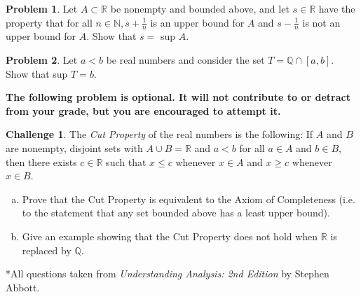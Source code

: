 \documentclass{amsart}
\newcommand{\+}[1]{\ensuremath{\mathbf{#1}}}
\newcommand{\R}{{\mathbb R}}
\theoremstyle{definition}
\newtheorem{prob}{Problem}
\newtheorem{chal}{Challenge}
\begin{document}
\begin{prob}
 Let $A \subset \R$ be nonempty and bounded above, and
 let $s \in \R$ have the property that for all 
 $n \in \mathbb{N}, s + \frac{1}{n}$ is an upper bound
 for $A$ and $s - \frac{1}{n}$ is not
 an upper bound for $A$.  Show that $s = $ sup $A$.
\end{prob}

\begin{prob}
 Let $a < b$ be real numbers and consider the set 
 $T = \mathbb{Q} \cap [a,b]$.
 Show that sup $T = b$.
\end{prob}




\vspace{5mm}

{\bf The following problem is optional.  It
will not contribute to or detract from your grade, but you are encouraged
to attempt it.}

\vspace{5mm}

\begin{chal}
The \emph{Cut Property} of the real numbers is the following:
If $A$ and $B$ are nonempty, disjoint sets with
$A \cup B = \R$ and $a < b$ for all $a \in A$ and $b \in B$,
then there exists $c \in \R$ such that $x \leq c$ whenever
$x \in A$ and $x \geq c$ whenever $x \in B$.
\begin{enumerate}[(a)]
 \item Prove that the Cut Property is equivalent
 to the Axiom of Completeness (i.e. to the statement
 that any set bounded above has a least upper bound).
 \item Give an example showing that the Cut Property does
 not hold when $\R$ is replaced by $\mathbb{Q}$.
\end{enumerate}
\end{chal}



\vspace{5mm}

*All questions taken from \emph{Understanding Analysis: 2nd Edition} by Stephen Abbott.
\end{document}
